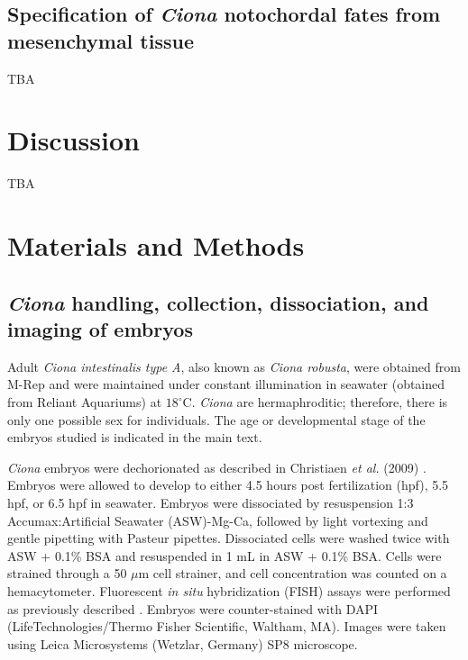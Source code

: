 \subsection{Specification of \textit{Ciona} notochordal fates from mesenchymal tissue}

TBA

\section{Discussion}

TBA

\section{Materials and Methods}

\subsection{\textit{Ciona} handling, collection, dissociation, and imaging of embryos}
Adult \textit{Ciona intestinalis type A}, also known as \textit{Ciona robusta}, were obtained from M-Rep and were maintained under constant illumination in seawater (obtained from Reliant Aquariums) at $18^\circ$C. \textit{Ciona} are hermaphroditic; therefore, there is only one possible sex for individuals. The age or developmental stage of the embryos studied is indicated in the main text.

\textit{Ciona} embryos were dechorionated as described in Christiaen \textit{et al.} (2009) \cite{christiaen2009}. Embryos were allowed to develop to either 4.5 hours post fertilization (hpf), 5.5 hpf, or 6.5 hpf in seawater. Embryos were dissociated by resuspension 1:3 Accumax:Artificial Seawater (ASW)-Mg-Ca, followed by light vortexing and gentle pipetting with Pasteur pipettes. Dissociated cells were washed twice with ASW + 0.1\% BSA and resuspended in 1 mL in ASW + 0.1\% BSA. Cells were strained through a 50 $\mu$m cell strainer, and cell concentration was counted on a hemacytometer. Fluorescent \textit{in situ} hybridization (FISH) assays were performed as previously described \cite{beh2007,ikuta2007,christiaen2009a,stolfi2014}. Embryos were counter-stained with DAPI (LifeTechnologies/Thermo Fisher Scientific, Waltham, MA). Images were taken using Leica Microsystems (Wetzlar, Germany) SP8 microscope.

